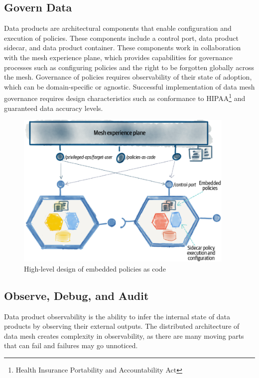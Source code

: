 \documentclass[12pt, a4paper]{book}
\begin{document}
\subsection{Govern Data}
Data products are architectural components that enable configuration and execution of policies. These components include a control port, data product sidecar, and data product container. These components work in collaboration with the mesh experience plane, which provides capabilities for governance processes such as configuring policies and the right to be forgotten globally across the mesh. Governance of policies requires observability of their state of adoption, which can be domain-specific or agnostic. Successful implementation of data mesh governance requires design characteristics such as conformance to HIPAA\footnote{Health Insurance Portability and Accountability Act} and guaranteed data accuracy levels.

\begin{figure}[ht]
	\begin{framed}
		\centering
		\includegraphics[width=10.5cm]{GovernData.png}
		\caption{High-level design of embedded policies as code}
		\label{GovernData}
	\end{framed}
	\vspace{-.8cm}
\end{figure}

\subsection{Observe, Debug, and Audit}
Data product observability is the ability to infer the internal state of data products by observing their external outputs. The distributed architecture of data mesh creates complexity in observability, as there are many moving parts that can fail and failures may go unnoticed.
\end{document}
